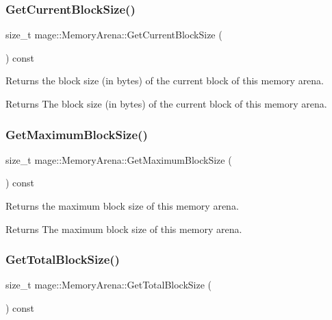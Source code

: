 \subsubsection{\texorpdfstring{Get\+Current\+Block\+Size()}{GetCurrentBlockSize()}}
{\footnotesize\ttfamily size\+\_\+t mage\+::\+Memory\+Arena\+::\+Get\+Current\+Block\+Size (\begin{DoxyParamCaption}{ }\end{DoxyParamCaption}) const\hspace{0.3cm}{\ttfamily [noexcept]}}

Returns the block size (in bytes) of the current block of this memory arena.

\begin{DoxyReturn}{Returns}
The block size (in bytes) of the current block of this memory arena. 
\end{DoxyReturn}
\hypertarget{classmage_1_1_memory_arena_a6786cf52a03777580b439cafdd8ff8f9}{}\label{classmage_1_1_memory_arena_a6786cf52a03777580b439cafdd8ff8f9} 
\subsubsection{\texorpdfstring{Get\+Maximum\+Block\+Size()}{GetMaximumBlockSize()}}
{\footnotesize\ttfamily size\+\_\+t mage\+::\+Memory\+Arena\+::\+Get\+Maximum\+Block\+Size (\begin{DoxyParamCaption}{ }\end{DoxyParamCaption}) const\hspace{0.3cm}{\ttfamily [noexcept]}}

Returns the maximum block size of this memory arena.

\begin{DoxyReturn}{Returns}
The maximum block size of this memory arena. 
\end{DoxyReturn}
\hypertarget{classmage_1_1_memory_arena_ac8e8ac4ba60cd2bb1d8dc8a5d4a9f4ad}{}\label{classmage_1_1_memory_arena_ac8e8ac4ba60cd2bb1d8dc8a5d4a9f4ad} 
\subsubsection{\texorpdfstring{Get\+Total\+Block\+Size()}{GetTotalBlockSize()}}
{\footnotesize\ttfamily size\+\_\+t mage\+::\+Memory\+Arena\+::\+Get\+Total\+Block\+Size (\begin{DoxyParamCaption}{ }\end{DoxyParamCaption}) const\hspace{0.3cm}{\ttfamily [noexcept]}}

